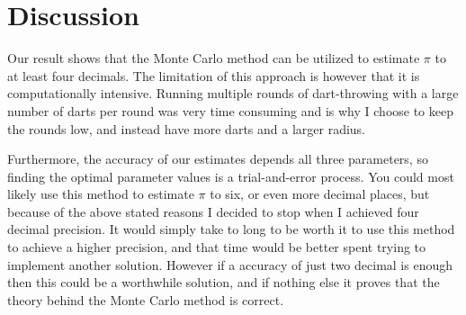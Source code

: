 \documentclass[a4paper,11pt]{article}
\begin{document}
\section*{Discussion}
Our result shows that the Monte Carlo method can be utilized to estimate $\pi$ to at least four decimals. The limitation of this 
approach is however that it is computationally intensive. Running multiple rounds of dart-throwing with a large number of darts per
round was very time consuming and is why I choose to keep the rounds low, and instead have more darts and a larger radius. 

Furthermore, the accuracy of our estimates depends all three parameters, so finding the optimal parameter values is a 
trial-and-error process. You could most likely use this method to estimate $\pi$ to six, or even more decimal places, but because 
of the above stated reasons I decided to stop when I achieved four decimal precision. It would simply take to long to be worth it 
to use this method to achieve a higher precision, and that time would be better spent trying to implement another solution. 
However if a accuracy of just two decimal is enough then this could be a worthwhile solution, and if nothing else it proves that the 
theory behind the Monte Carlo method is correct. 
\end{document}
